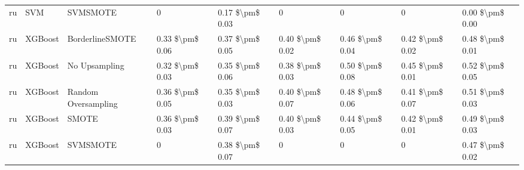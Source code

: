 \begin{tabular}{lllllllll}
      ru &                             SVM &                      SVMSMOTE &               0 &           0.17 \$\textbackslash pm\$ 0.03 &                     0 &                      0 &                                       0 &     0.00 \$\textbackslash pm\$ 0.00 \\
      ru &                         XGBoost &               BorderlineSMOTE & 0.33 \$\textbackslash pm\$ 0.06 &           0.37 \$\textbackslash pm\$ 0.05 &       0.40 \$\textbackslash pm\$ 0.02 &        0.46 \$\textbackslash pm\$ 0.04 &                         0.42 \$\textbackslash pm\$ 0.02 &     0.48 \$\textbackslash pm\$ 0.01 \\
      ru &                         XGBoost &                 No Upsampling & 0.32 \$\textbackslash pm\$ 0.03 &           0.35 \$\textbackslash pm\$ 0.06 &       0.38 \$\textbackslash pm\$ 0.03 &        0.50 \$\textbackslash pm\$ 0.08 &                         0.45 \$\textbackslash pm\$ 0.01 &     0.52 \$\textbackslash pm\$ 0.05 \\
      ru &                         XGBoost &           Random Oversampling & 0.36 \$\textbackslash pm\$ 0.05 &           0.35 \$\textbackslash pm\$ 0.03 &       0.40 \$\textbackslash pm\$ 0.07 &        0.48 \$\textbackslash pm\$ 0.06 &                         0.41 \$\textbackslash pm\$ 0.07 &     0.51 \$\textbackslash pm\$ 0.03 \\
      ru &                         XGBoost &                         SMOTE & 0.36 \$\textbackslash pm\$ 0.03 &           0.39 \$\textbackslash pm\$ 0.07 &       0.40 \$\textbackslash pm\$ 0.03 &        0.44 \$\textbackslash pm\$ 0.05 &                         0.42 \$\textbackslash pm\$ 0.01 &     0.49 \$\textbackslash pm\$ 0.03 \\
      ru &                         XGBoost &                      SVMSMOTE &               0 &           0.38 \$\textbackslash pm\$ 0.07 &                     0 &                      0 &                                       0 &     0.47 \$\textbackslash pm\$ 0.02 \\
\bottomrule
\end{tabular}
